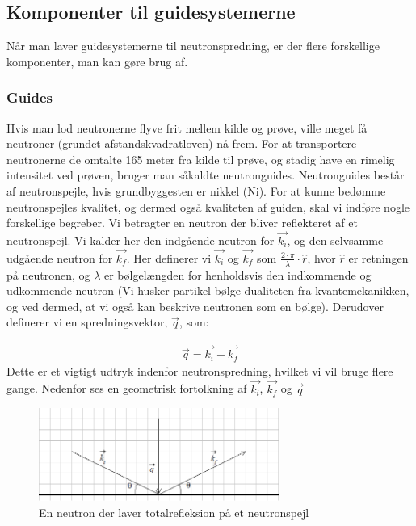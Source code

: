 \documentclass[12pt,oneside,a4paper]{article}
\begin{document}
{{{{{\subsection{Komponenter til guidesystemerne}
Når man laver guidesystemerne til neutronspredning, er der flere forskellige komponenter, man kan gøre brug af.

\subsubsection{Guides}

Hvis man lod neutronerne flyve frit mellem kilde og prøve, ville meget få neutroner (grundet afstandskvadratloven) nå frem. For at transportere neutronerne de omtalte 165 meter fra kilde til prøve, og stadig have en rimelig intensitet ved prøven, bruger man såkaldte neutronguides. Neutronguides består af neutronspejle, hvis grundbyggesten er nikkel (Ni).
For at kunne bedømme neutronspejles kvalitet, og dermed også kvaliteten af guiden, skal vi indføre nogle forskellige begreber. Vi betragter en neutron der bliver reflekteret af et neutronspejl. Vi kalder her den indgående neutron for $\vec{k_i}$, og den selvsamme udgående neutron for  $\vec{k_f}$. Her definerer vi $\vec{k_i}$ og $\vec{k_f}$ som  $ {\frac{2 \cdot \pi}{\lambda}} \cdot \hat{r}$, hvor $\hat{r}$ er retningen på neutronen, og $\lambda$ er bølgelængden for henholdsvis den indkommende og udkommende neutron (Vi husker partikel-bølge dualiteten fra kvantemekanikken, og ved dermed, at vi også kan beskrive neutronen som en bølge). Derudover definerer vi en spredningsvektor, $\vec{q}$, som:

\begin{align}
\vec{q}=\vec{k_i}-\vec{k_f}
\end{align}
Dette er et vigtigt udtryk indenfor neutronspredning, hvilket vi vil bruge flere gange. Nedenfor ses en geometrisk fortolkning af $\vec{k_i}$, $\vec{k_f}$  og $ \vec{q}$

\begin{figure}[H]
\centering
\includegraphics[width=0.7\textwidth]{billede3.png}
\caption{En neutron der laver totalrefleksion på et neutronspejl}
\end{figure}

}}}}}
\end{document}
